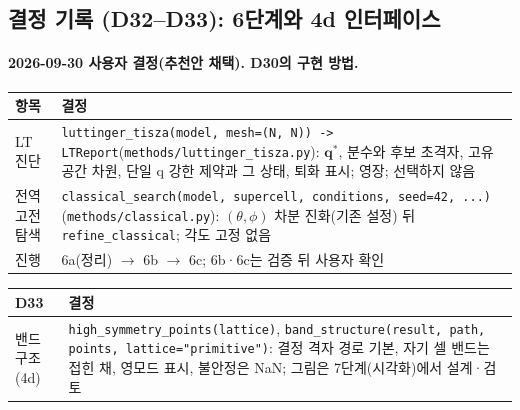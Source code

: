 \subsection{결정 기록 (D32--D33): 6단계와 4d 인터페이스}\label{decisions-d32}
\begingroup%
  \framesubtitle{2026-09-30 사용자 결정(추천안 채택). D30의 구현 방법.}
  \small\renewcommand{\arraystretch}{1.12}
  \begin{tabularx}{\textwidth}{@{}P{3.0cm}Y@{}}
    \toprule
    항목 & 결정 \\
    \midrule
    LT 진단 & \texttt{luttinger\_tisza(model, mesh=(N, N)) -> LTReport}(\texttt{methods/luttinger\_tisza.py}): $\mathbf q^*$, 분수와 후보 초격자, 고유공간 차원, 단일 q 강한 제약과 그 상태, 퇴화 표시; 영장; 선택하지 않음 \\
    전역 고전 탐색 & \texttt{classical\_search(model, supercell, conditions, seed=42, ...)}(\texttt{methods/classical.py}): $(\theta,\phi)$ 차분 진화(기존 설정) 뒤 \texttt{refine\_classical}; 각도 고정 없음 \\
    진행 & 6a(정리) $\to$ 6b $\to$ 6c; 6b·6c는 검증 뒤 사용자 확인 \\
    \bottomrule
  \end{tabularx}
  \par\medskip
  \begin{tabularx}{\textwidth}{@{}P{3.0cm}Y@{}}
    \toprule
    D33 & 결정 \\
    \midrule
    밴드 구조(4d) & \texttt{high\_symmetry\_points(lattice)}, \texttt{band\_structure(result, path, points, lattice="primitive")}: 결정 격자 경로 기본, 자기 셀 밴드는 접힌 채, 영모드 표시, 불안정은 NaN; 그림은 7단계(시각화)에서 설계·검토 \\
    \bottomrule
  \end{tabularx}
\endgroup


